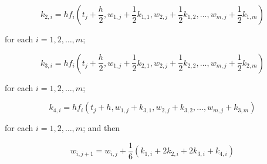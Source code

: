 \begin{equation}\label{eqn:hoesdeeq6}
k_{2, i} =h f_{i}\left(t_{j}+\frac{h}{2}, w_{1, j}+\frac{1}{2} k_{1,1}, w_{2, j}+\frac{1}{2} k_{1,2}, \ldots, w_{m, j}+\frac{1}{2} k_{1, m}\right)
\end{equation}

for each $i=1,2, \ldots, m$;

\begin{equation}\label{eqn:hoesdeeq7}
k_{3, i}=h f_{i}\left(t_{j}+\frac{h}{2}, w_{1, j}+\frac{1}{2} k_{2,1}, w_{2, j}+\frac{1}{2} k_{2,2}, \ldots, w_{m, j}+\frac{1}{2} k_{2, m}\right) \tag{5.51}
\end{equation}

for each $i=1,2, \ldots, m$;

\begin{equation}\label{eqn:hoesdeeq8}
k_{4, i}=h f_{i}\left(t_{j}+h, w_{1, j}+k_{3,1}, w_{2, j}+k_{3,2}, \ldots, w_{m, j}+k_{3, m}\right)
\end{equation}

for each $i=1,2, \ldots, m$; and then

\begin{equation}\label{eqn:hoesdeeq9}
w_{i, j+1}=w_{i, j}+\frac{1}{6}\left(k_{1, i}+2 k_{2, i}+2 k_{3, i}+k_{4, i}\right)
\end{equation}

